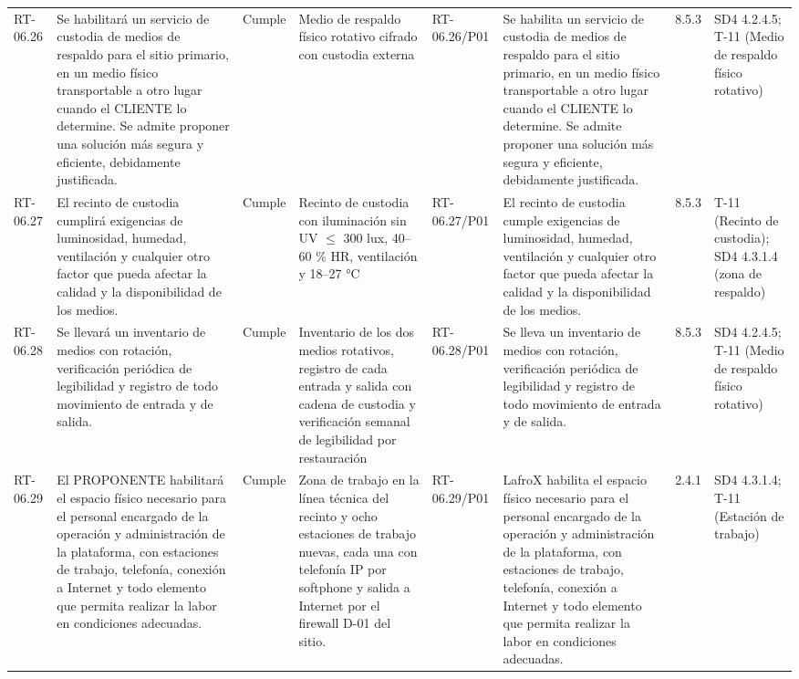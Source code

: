 \documentclass[oficio,firma,final]{lafrox}
\begin{document}
\begin{landscape}
{\begin{longtable}{@{}F{0.054} F{0.173} F{0.061} F{0.191} F{0.106} F{0.180} F{0.067} F{0.168}@{}}
  RT-06.26 & Se habilitará un servicio de custodia de medios de respaldo para el sitio primario, en un medio físico transportable a otro lugar cuando el CLIENTE lo determine. Se admite proponer una solución más segura y eficiente, debidamente justificada. & Cumple & Medio de respaldo físico rotativo cifrado con custodia externa & RT-06.26/\allowbreak{}P01 & Se habilita un servicio de custodia de medios de respaldo para el sitio primario, en un medio físico transportable a otro lugar cuando el CLIENTE lo determine. Se admite proponer una solución más segura y eficiente, debidamente justificada. & 8.5.3 & SD4 4.2.4.5; T-11 (Medio de respaldo físico rotativo)  \\
  RT-06.27 & El recinto de custodia cumplirá exigencias de luminosidad, humedad, ventilación y cualquier otro factor que pueda afectar la calidad y la disponibilidad de los medios. & Cumple & Recinto de custodia con iluminación sin UV $\leq$ 300 lux, 40–60 \% HR, ventilación y 18–27 °C & RT-06.27/\allowbreak{}P01 & El recinto de custodia cumple exigencias de luminosidad, humedad, ventilación y cualquier otro factor que pueda afectar la calidad y la disponibilidad de los medios. & 8.5.3 & T-11 (Recinto de custodia); SD4 4.3.1.4 (zona de respaldo)  \\
  RT-06.28 & Se llevará un inventario de medios con rotación, verificación periódica de legibilidad y registro de todo movimiento de entrada y de salida. & Cumple & Inventario de los dos medios rotativos, registro de cada entrada y salida con cadena de custodia y verificación semanal de legibilidad por restauración & RT-06.28/\allowbreak{}P01 & Se lleva un inventario de medios con rotación, verificación periódica de legibilidad y registro de todo movimiento de entrada y de salida. & 8.5.3 & SD4 4.2.4.5; T-11 (Medio de respaldo físico rotativo)  \\
  RT-06.29 & El PROPONENTE habilitará el espacio físico necesario para el personal encargado de la operación y administración de la plataforma, con estaciones de trabajo, telefonía, conexión a Internet y todo elemento que permita realizar la labor en condiciones adecuadas. & Cumple & Zona de trabajo en la línea técnica del recinto y ocho estaciones de trabajo nuevas, cada una con telefonía IP por softphone y salida a Internet por el firewall D-01 del sitio. & RT-06.29/\allowbreak{}P01 & LafroX habilita el espacio físico necesario para el personal encargado de la operación y administración de la plataforma, con estaciones de trabajo, telefonía, conexión a Internet y todo elemento que permita realizar la labor en condiciones adecuadas. & 2.4.1 & SD4 4.3.1.4; T-11 (Estación de trabajo)  \\

\end{longtable}}
\end{landscape}
\end{document}
